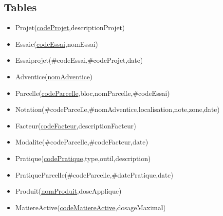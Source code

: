 \documentclass{article}
\begin{document}
\subsection{Tables}
\begin{itemize}
  \item Projet(\underline{codeProjet},descriptionProjet)  
  \item Essaie(\underline{codeEssai},nomEssai)
  \item Essaiprojet(\#codeEssai,\#codeProjet,date)
  \item Adventice(\underline{nomAdventice}) 
  \item Parcelle(\underline{codeParcelle},bloc,nomParcelle,\#codeEssai)
  \item Notation(\#codeParcelle,\#nomAdventice,localisation,note,zone,date)
  \item Facteur(\underline{codeFacteur},descriptionFacteur)
  \item Modalite(\#codeParcelle,\#codeFacteur,date)
  \item Pratique(\underline{codePratique},type,outil,description)
  \item PratiqueParcelle(\#codeParcelle,\#datePratique,date)
  \item Produit(\underline{nomProduit},doseApplique)
  \item MatiereActive(\underline{codeMatiereActive},dosageMaximal)
\end{itemize}






\end{document}
